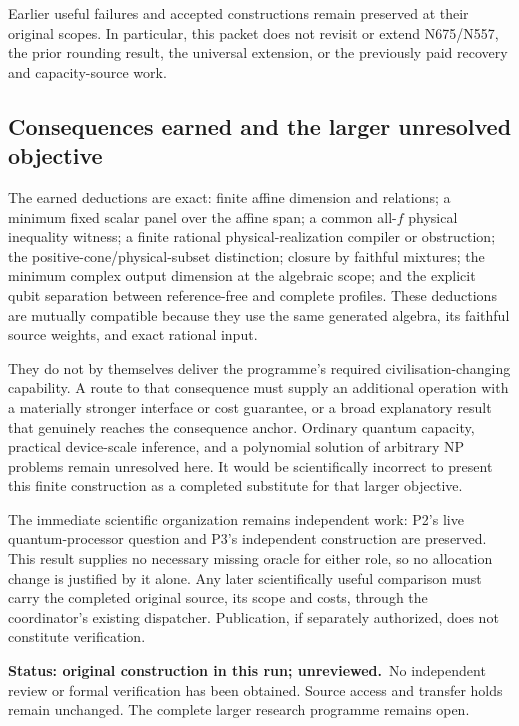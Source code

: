\documentclass[11pt,a4paper]{article}
\theoremstyle{definition}\newtheorem{definition}[theorem]{Definition}
\newcommand{\status}{\textbf{Status: original construction in this run; unreviewed.}}
\begin{document}
Earlier useful failures and accepted constructions remain preserved at their original scopes. In particular, this packet does not revisit or extend N675/N557, the prior rounding result, the universal extension, or the previously paid recovery and capacity-source work.

\subsection{Consequences earned and the larger unresolved objective}

The earned deductions are exact: finite affine dimension and relations; a minimum fixed scalar panel over the affine span; a common all-$f$ physical inequality witness; a finite rational physical-realization compiler or obstruction; the positive-cone/physical-subset distinction; closure by faithful mixtures; the minimum complex output dimension at the algebraic scope; and the explicit qubit separation between reference-free and complete profiles. These deductions are mutually compatible because they use the same generated algebra, its faithful source weights, and exact rational input.

They do not by themselves deliver the programme's required civilisation-changing capability. A route to that consequence must supply an additional operation with a materially stronger interface or cost guarantee, or a broad explanatory result that genuinely reaches the consequence anchor. Ordinary quantum capacity, practical device-scale inference, and a polynomial solution of arbitrary NP problems remain unresolved here. It would be scientifically incorrect to present this finite construction as a completed substitute for that larger objective.

The immediate scientific organization remains independent work: P2's live quantum-processor question and P3's independent construction are preserved. This result supplies no necessary missing oracle for either role, so no allocation change is justified by it alone. Any later scientifically useful comparison must carry the completed original source, its scope and costs, through the coordinator's existing dispatcher. Publication, if separately authorized, does not constitute verification.

\status\ No independent review or formal verification has been obtained. Source access and transfer holds remain unchanged. The complete larger research programme remains open.
\end{document}
